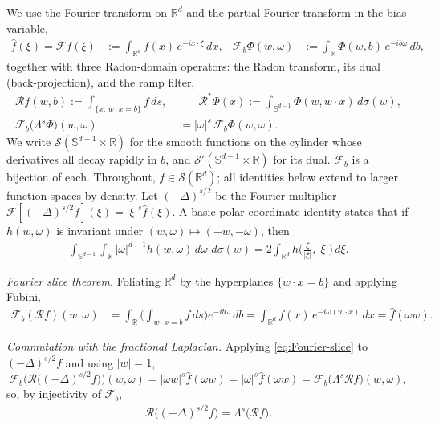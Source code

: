 \documentclass[12pt]{article}
\numberwithin{equation}{section}
\numberwithin{figure}{section}
\numberwithin{equation}{section}
\newcommand{\R}{\mathbb{R}}
\newcommand{\Sph}{\mathbb S}
\newcommand{\ddsigma}{\,d\sigma}
\newcommand{\ddx}{\,dx}
\newcommand{\abs}[1]{\left|#1\right|}
\begin{document}
We use the Fourier transform on $\R^d$ and the partial Fourier transform in the
bias variable,
\begin{align*}
    \widehat f(\xi) = \mathcal{F} f(\xi)
    &:=
    \int_{\R^d} f(x)\,e^{-ix\cdot\xi}\ddx,
    &
    \mathcal F_b\Phi(w,\omega)
    &:=
    \int_\R\Phi(w,b)\,e^{-ib\omega}\,db ,
\end{align*}
together with three Radon-domain operators: the Radon transform, its dual
(back-projection), and the ramp filter,
\begin{align*}
    \mathcal Rf(w,b):=\int_{\{x:\,w\cdot x=b\}}\!\!f\,ds,
    &\qquad
    \mathcal R^*\Phi(x):=\int_{\Sph^{d-1}}\Phi(w,w\cdot x)\ddsigma(w), \\
    \mathcal F_b\big(\Lambda^{s}\Phi\big)(w,\omega)
    &:=\abs{\omega}^{s}\,\mathcal F_b\Phi(w,\omega).
\end{align*}
We write $\mathcal S(\mathbb S^{d-1}\times\mathbb R)$ for the smooth functions on the
cylinder whose derivatives all decay rapidly in $b$, and
$\mathcal S'(\mathbb S^{d-1}\times\mathbb R)$ for its dual. $\mathcal F_b$ is a bijection
of each.
Throughout, $f\in\mathcal S(\R^d)$; all identities below extend to larger function
spaces by density. Let $(-\Delta)^{s/2}$ be the Fourier
multiplier $\mathcal{F} \left[(-\Delta)^{s/2}f\right](\xi)=\abs{\xi}^{s}\widehat f(\xi)$.
A basic polar-coordinate identity states that if $h(w,\omega)$ is invariant under
$(w,\omega)\mapsto(-w,-\omega)$, then
\begin{align}
    \int_{\Sph^{d-1}}\!\!\int_\R \abs{\omega}^{d-1}h(w,\omega)\,d\omega\,\ddsigma(w)
    =2\int_{\R^d} h\big(\tfrac{\xi}{\abs{\xi}},\abs{\xi}\big)\,d\xi .
    \label{eq:antipodal}
\end{align}

\smallskip\noindent\emph{Fourier slice theorem.}
Foliating $\R^d$ by the hyperplanes $\{w\cdot x=b\}$ and applying Fubini,
\begin{align}
    \mathcal F_b(\mathcal R f)(w,\omega)
    &=\int_\R\!\Big(\int_{w\cdot x=b}\!\!f\,ds\Big)e^{-ib\omega}\,db
    =\int_{\R^d}f(x)\,e^{-i\omega(w\cdot x)}\ddx
    =\widehat f(\omega w).
    \label{eq:Fourier-slice}
\end{align}

\smallskip\noindent\emph{Commutation with the fractional Laplacian.}
Applying \eqref{eq:Fourier-slice} to $(-\Delta)^{s/2}f$ and using $\abs{w}=1$,
$$
    \mathcal F_b\!\Big(\mathcal R\big((-\Delta)^{s/2}f\big)\Big)(w,\omega)
    =\abs{\omega w}^{s}\widehat f(\omega w)
    =\abs{\omega}^{s}\widehat f(\omega w)
    =\mathcal F_b\!\big(\Lambda^{s}\mathcal Rf\big)(w,\omega),
$$
so, by injectivity of $\mathcal F_b$,
\begin{align}\label{eq:radon-laplace-commute}
    \mathcal R\big((-\Delta)^{s/2} f\big)=\Lambda^{s}\big(\mathcal R f\big).
\end{align}
\end{document}
